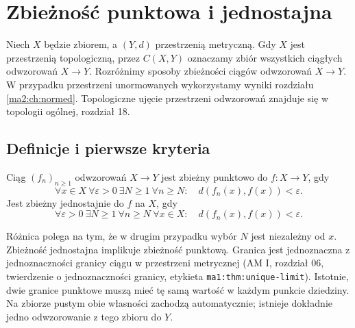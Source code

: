 \chapter{Zbieżność punktowa i jednostajna}
\label{ma2:ch:uniform-convergence}

Niech $X$ będzie zbiorem, a $(Y,d)$ przestrzenią
metryczną. Gdy $X$ jest przestrzenią topologiczną,
przez $C(X,Y)$ oznaczamy zbiór wszystkich ciągłych
odwzorowań $X\to Y$. Rozróżnimy sposoby zbieżności ciągów
odwzorowań $X\to Y$. W przypadku przestrzeni
unormowanych wykorzystamy wyniki rozdziału
\ref{ma2:ch:normed}. Topologiczne ujęcie przestrzeni
odwzorowań znajduje się w topologii ogólnej, rozdział 18.

\section{Definicje i pierwsze kryteria}

\begin{definicja}
\label{ma2:def:pointwise-uniform}
Ciąg $(f_n)_{n\ge1}$ odwzorowań $X\to Y$ jest
zbieżny punktowo do $f:X\to Y$, gdy
\[
 \forall x\in X\ \forall\varepsilon>0\ \exists N\ge1\
 \forall n\ge N:\quad d(f_n(x),f(x))<\varepsilon.
\]
Jest zbieżny jednostajnie do $f$ na $X$, gdy
\[
 \forall\varepsilon>0\ \exists N\ge1\
 \forall n\ge N\ \forall x\in X:\quad
 d(f_n(x),f(x))<\varepsilon.
\]
\end{definicja}
Różnica polega na tym, że w drugim przypadku wybór
$N$ jest niezależny od $x$. Zbieżność jednostajna
implikuje zbieżność punktową. Granica jest jednoznaczna
z jednoznaczności granicy ciągu w przestrzeni metrycznej
(AM I, rozdział 06, twierdzenie o jednoznaczności
granicy, etykieta \texttt{ma1:thm:unique-limit}).
Istotnie, dwie granice punktowe muszą mieć tę samą
wartość w każdym punkcie dziedziny. Na zbiorze pustym obie własności
zachodzą automatycznie; istnieje dokładnie jedno
odwzorowanie z tego zbioru do $Y$.

